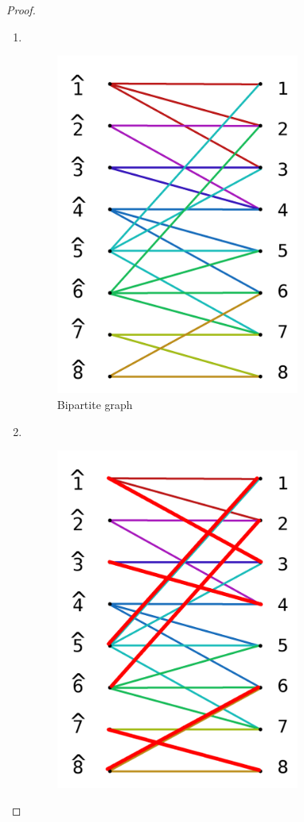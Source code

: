 \begin{proof}$\,$\pn

    \begin{enumerate}[label=(\roman*)]
        \item   $\,$\pn  
            \begin{figure}[H]
                \begin{center}
                    \includegraphics[width=8cm]{Test2/Problem12/BipartiteGraph.png}
                \end{center}                            
                \caption{Bipartite graph}
                \label{t2:p12_BipartiteGraph.png}                        
            \end{figure}\pn 
         \item $\,$\pn  
            \begin{figure}[H]
                \begin{center}
                    \includegraphics[width=8cm]{Test2/Problem12/BipartiteGraph_Matching.png}

\end{center}
\end{figure}
\end{enumerate}
\end{proof}

